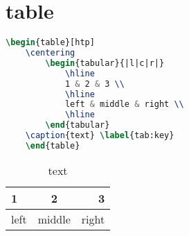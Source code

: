 \documentclass[11pt,a4paper]{article}
\begin{document}
\section{table}
\begin{lstlisting}[language = TeX]
	\begin{table}[htp]
	\centering
		\begin{tabular}{|l|c|r|}
			\hline
			1 & 2 & 3 \\
			\hline
			left & middle & right \\
			\hline
		\end{tabular}
	\caption{text} \label{tab:key}
	\end{table}
\end{lstlisting}

\begin{table}[htp]
	\centering
	\begin{tabular}{|l|c|r|}
		\hline
		1 & 2 & 3 \\
		\hline
		left & middle & right \\
		\hline
	\end{tabular}
	\caption{text} \label{tab:key}
\end{table}		
\end{document}
